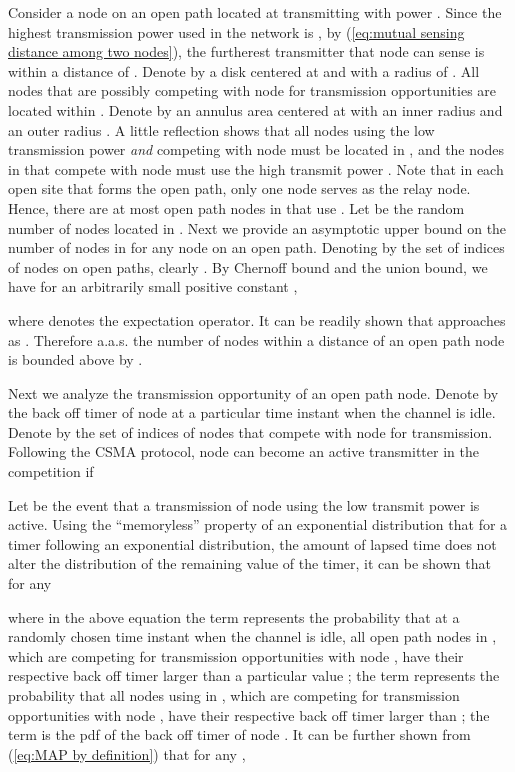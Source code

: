 \documentclass[english]{IEEEtran}
\theoremstyle{plain}
\theoremstyle{plain}
\theoremstyle{plain}
\theoremstyle{remark}
\begin{document}
Consider a node  on an open path located at 
transmitting with power .
Since the highest transmission power used in the network is ,
by (\ref{eq:mutual sensing distance among two nodes}), the furtherest
transmitter that node  can sense is within a distance of .
Denote by  a disk centered
at  and with a radius of . All nodes that are
possibly competing with node  for transmission opportunities are
located within .
Denote by 
an annulus area centered at  with an inner radius
 and an outer radius . A little reflection shows that
all nodes using the low transmission power  \emph{and} competing
with node  must be located in ,
and the nodes in 
that compete with node  must use the high transmit
power . Note that in each open site that forms the open path,
only one node serves as the relay node. Hence, there are at most 
open path nodes in 
that use . Let 
be the random number of nodes located in .
Next we provide an asymptotic upper bound on the number of  nodes
in 
for any node  on an open path. Denoting by  the
set of indices of nodes on open paths, clearly .
By Chernoff bound and the union bound, we have for an arbitrarily
small positive constant ,

where  denotes the expectation operator. It can be readily shown
that 
approaches  as . Therefore a.a.s. the number
of nodes within a distance 
of an open path node is bounded above by .

Next we analyze the transmission opportunity of an open path node.
Denote by  the back off timer of node  at a particular
time instant when the channel is idle. Denote by 
the set of indices of nodes that compete with node  for transmission.
Following the CSMA protocol, node  can become an active transmitter
in the competition if 

Let  be the event that a transmission of node 
using the low transmit power is active. Using the ``memoryless''
property of an exponential distribution that for a timer following
an exponential distribution, the amount of lapsed time does not alter
the distribution of the remaining value of the timer, it can be shown
that for any 

where in the above equation the term 
represents the probability that at a randomly chosen time instant
when the channel is idle, all 
open path nodes in ,
which are competing for transmission opportunities with node ,
have their respective back off timer larger than a particular value
; the term 
represents the probability that all nodes using  in ,
which are competing for transmission opportunities with node ,
have their respective back off timer larger than ; the term 
is the pdf of the back off timer of node . It can be further shown
from (\ref{eq:MAP by definition}) that for any ,
\end{document}
